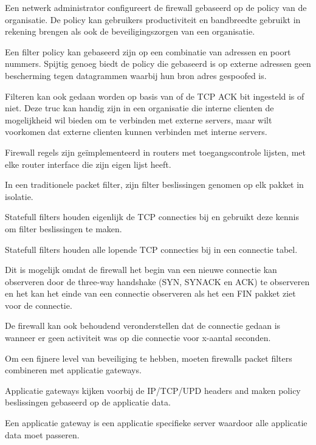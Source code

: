 \noindent Een netwerk administrator configureert de firewall gebaseerd op de policy van de organisatie. De policy kan gebruikers productiviteit en bandbreedte gebruikt in rekening brengen als ook de beveiligingszorgen van een organisatie. 

\noindent Een filter policy kan gebaseerd zijn op een combinatie van adressen en poort nummers. Spijtig genoeg biedt de policy die gebaseerd is op externe adressen geen bescherming tegen datagrammen waarbij hun bron adres gespoofed is.

\noindent Filteren kan ook gedaan worden op basis van of de TCP ACK bit ingesteld is of niet. Deze truc kan handig zijn in een organisatie die interne clienten de mogelijkheid wil bieden om te verbinden met externe servers, maar wilt voorkomen dat externe clienten kunnen verbinden met interne servers.

\noindent Firewall regels zijn geïmplementeerd in routers met toegangscontrole lijsten, met elke router interface die zijn eigen lijst heeft.


\noindent In een traditionele packet filter, zijn filter beslissingen genomen op elk pakket in isolatie. 

\noindent Statefull filters houden eigenlijk de TCP connecties bij en gebruikt deze kennis om filter beslissingen te maken.

\noindent Statefull filters houden alle lopende TCP connecties bij in een connectie tabel. 

Dit is mogelijk omdat de firewall het begin van een nieuwe connectie kan observeren door de three-way handshake (SYN, SYNACK en ACK) te observeren en het kan het einde van een connectie observeren als het een FIN pakket ziet voor de connectie. 

De firewall kan ook behoudend veronderstellen dat de connectie gedaan is wanneer er geen activiteit was op die connectie voor x-aantal seconden.


\noindent Om een fijnere level van beveiliging te hebben, moeten firewalls packet filters combineren met applicatie gateways.

\noindent Applicatie gateways kijken voorbij de IP/TCP/UPD headers and maken policy beslissingen gebaseerd op de applicatie data.

\noindent Een applicatie gateway is een applicatie specifieke server waardoor alle applicatie data moet passeren. 

